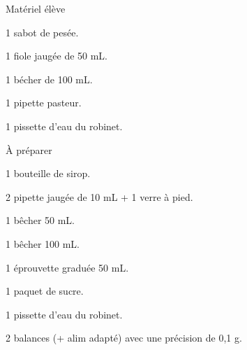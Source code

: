 
\begin{boiteMateriel}{Matériel élève}
  \effectifSeconde

  \begin{protocole}
    \item 1 sabot de pesée.
    \item 1 fiole jaugée de 50 mL.
    \item 1 bécher de 100 mL.
    \item 1 pipette pasteur.
    \item 1 pissette d’eau du robinet.
  \end{protocole}
\end{boiteMateriel}


\begin{boiteMateriel}{À préparer}
  \begin{protocole}
    \item 1 bouteille de sirop.
    \item 2 pipette jaugée de 10 mL + 1 verre à pied.
    \item 1 bêcher 50 mL.
    \item 1 bêcher 100 mL.
    \item 1 éprouvette graduée 50 mL.
    \item 1 paquet de sucre.
    \item 1 pissette d’eau du robinet.
    \item 2 balances (+ alim adapté) avec une précision de 0,1 g.
  \end{protocole}
\end{boiteMateriel}